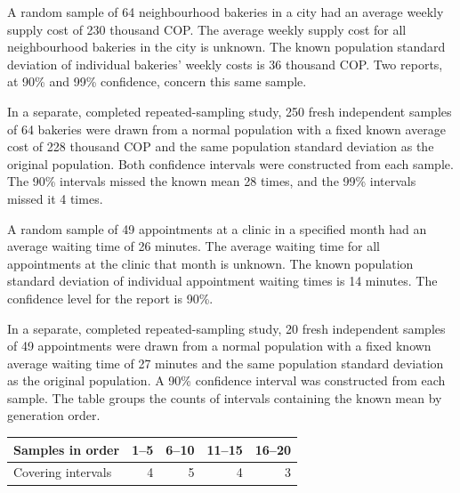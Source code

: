 A random sample of 64 neighbourhood bakeries in a city had an average weekly supply cost of 230 thousand COP. The average weekly supply cost for all neighbourhood bakeries in the city is unknown. The known population standard deviation of individual bakeries' weekly costs is 36 thousand COP. Two reports, at 90\% and 99\% confidence, concern this same sample.

In a separate, completed repeated-sampling study, 250 fresh independent samples of 64 bakeries were drawn from a normal population with a fixed known average cost of 228 thousand COP and the same population standard deviation as the original population. Both confidence intervals were constructed from each sample. The 90\% intervals missed the known mean 28 times, and the 99\% intervals missed it 4 times.

\noindent\begin{minipage}[t]{0.60\linewidth}
\vspace{0pt}
A random sample of 49 appointments at a clinic in a specified month had an average waiting time of 26 minutes. The average waiting time for all appointments at the clinic that month is unknown. The known population standard deviation of individual appointment waiting times is 14 minutes. The confidence level for the report is 90\%.

In a separate, completed repeated-sampling study, 20 fresh independent samples of 49 appointments were drawn from a normal population with a fixed known average waiting time of 27 minutes and the same population standard deviation as the original population. A 90\% confidence interval was constructed from each sample. The table groups the counts of intervals containing the known mean by generation order.
\end{minipage}\hfill
\begin{minipage}[t]{0.38\linewidth}
\vspace{0pt}
\centering
\small
\setlength{\tabcolsep}{4pt}
\begin{tabularx}{\linewidth}{@{}>{\raggedright\arraybackslash}Xrrrr@{}}\toprule
Samples in order & 1--5 & 6--10 & 11--15 & 16--20\\\midrule
Covering intervals & 4 & 5 & 4 & 3\\
\bottomrule\end{tabularx}
\end{minipage}\par

